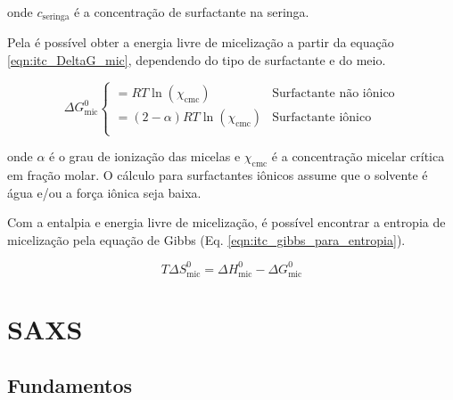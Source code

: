 		\noindent onde \(c_{\textrm{seringa}}\) é a concentração de surfactante na seringa.
		
		Pela \cmc{} é possível obter a energia livre de micelização a partir da equação \ref{eqn:itc_DeltaG_mic}, dependendo do tipo de surfactante e do meio.
		
		\begin{equation}
			\Delta G_{\textrm{mic}}^0
			\begin{cases}
			= RT\ln(\chi_{\textrm{cmc}})      & \textrm{Surfactante não iônico}      \\
			= (2-\alpha)RT\ln(\chi_{\textrm{cmc}}) & \textrm{Surfactante iônico}					\\
			\end{cases}
			\label{eqn:itc_DeltaG_mic}
		\end{equation}
		
		\noindent onde \(\alpha\) é o grau de ionização das micelas e \(\chi_{\textrm{cmc}}\) é a concentração micelar crítica em fração molar. O cálculo para surfactantes iônicos assume que o solvente é água e/ou a força iônica seja baixa.
		
		Com a entalpia e energia livre de micelização, é possível encontrar a entropia de micelização pela equação de Gibbs (Eq. \ref{eqn:itc_gibbs_para_entropia}).
		
		\begin{equation}
			T\Delta S^0_{\textrm{mic}} = \Delta H^0_{\textrm{mic}} - \Delta G^0_{\textrm{mic}}
			\label{eqn:itc_gibbs_para_entropia}
		\end{equation}


	\chapter{SAXS}
		\section{Fundamentos}
				
		
